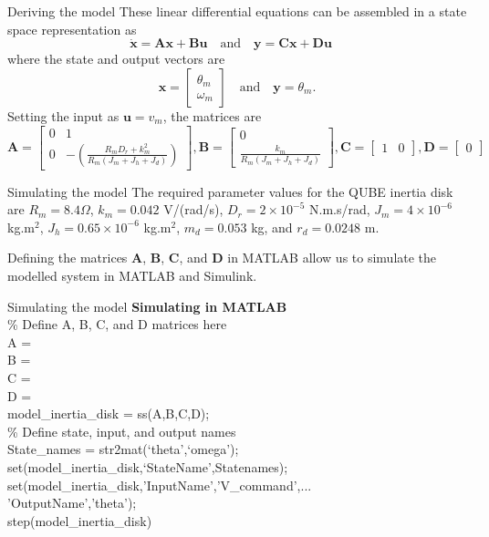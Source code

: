 \documentclass[9pt]{beamer-control}
\begin{document}
\begin{frame}{Deriving the model}
These linear differential equations can be assembled in a state space representation as 
\[\dot{\mathbf{x}} =\mathbf{A}\mathbf{x} + \mathbf{B} \mathbf{u} \quad \text{and} \quad \mathbf{y} =\mathbf{C}\mathbf{x} + \mathbf{D} \mathbf{u} \quad \]	
where the state and output vectors are
\[\mathbf{x} = \begin{bmatrix}
\theta_m \\ \omega_m
\end{bmatrix}
\quad \text{and} \quad \mathbf{y} = \theta_m .\]
Setting the input as $\mathbf{u}=v_m$, the matrices are
\[
\mathbf{A}=\begin{bmatrix}
	0 & 1 \\
	0 & -\left(\tfrac{R_m D_r + k_m^2}{R_m(J_m+J_h+J_d)}\right)
\end{bmatrix},
\mathbf{B} = \begin{bmatrix}
	0 \\ \tfrac{k_m}{R_m(J_m+J_h+J_d)}
\end{bmatrix}, 
\mathbf{C} = \begin{bmatrix}
	1 & 0
\end{bmatrix},
\mathbf{D} = \begin{bmatrix}
	0
\end{bmatrix}
\]  
\end{frame}

\begin{frame}{Simulating the model}
The required parameter values for the QUBE inertia disk are $R_m=8.4\Omega$, $k_m=0.042$ V/(rad/s), $D_r=2\times 10^{-5}$ N.m.s/rad, $J_m = 4\times 10^{-6}$ kg.m$^2$, $J_h = 0.65 \times 10^{-6}$ kg.m$^2$, $m_d=0.053$ kg, and $r_d = 0.0248$ m.

Defining the matrices $\mathbf{A}$, $\mathbf{B}$, $\mathbf{C}$, and $\mathbf{D}$ in MATLAB allow us to simulate the modelled system in MATLAB and Simulink.
\end{frame}

\begin{frame}{Simulating the model}
\textbf{Simulating in MATLAB}\\
\% Define A, B, C, and D matrices here\\
A = \\
B = \\
C = \\
D = \\
model\_inertia\_disk = ss(A,B,C,D); \\
\% Define state, input, and output names\\
State\_names = str2mat(`theta',`omega');\\
set(model\_inertia\_disk,`StateName',Statenames);\\
set(model\_inertia\_disk,'InputName',{'V\_{command}'},...\\
'OutputName',{'theta'}); \\
step(model\_inertia\_disk)
\end{frame}
\end{document}
